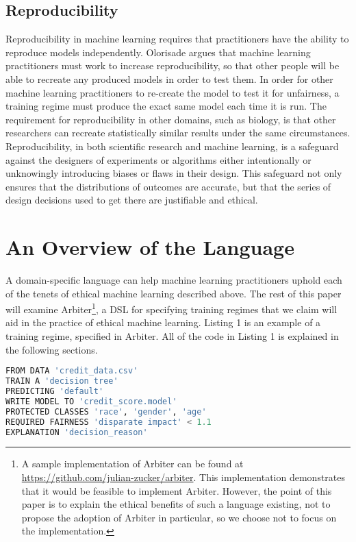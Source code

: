 \documentclass[sigconf]{acmart}
\begin{document}
\subsection{Reproducibility}
Reproducibility in machine learning requires that practitioners have the ability to reproduce models independently. Olorisade  argues that machine learning practitioners must work to increase reproducibility, so that other people will be able to recreate any produced models in order to test them. In order for other machine learning practitioners to re-create the model to test it for unfairness, a training regime must produce the exact same model each time it is run. The requirement for reproducibility in other domains, such as biology, is that other researchers can recreate statistically similar results under the same circumstances. Reproducibility, in both scientific research and machine learning, is a safeguard against the designers of experiments or algorithms either intentionally or unknowingly introducing biases or flaws in their design. This safeguard not only ensures that the distributions of outcomes are accurate, but that the series of design decisions used to get there are justifiable and ethical.

\section{An Overview of the Language}
A domain-specific language can help machine learning practitioners uphold each of the tenets of ethical machine learning described above. The rest of this paper will examine Arbiter\footnote{A sample implementation of Arbiter can be found at \href{https://github.com/julian-zucker/arbiter}{https://github.com/julian-zucker/arbiter}. This implementation demonstrates that it would be feasible to implement Arbiter. However, the point of this paper is to explain the ethical benefits of such a language existing, not to propose the adoption of Arbiter in particular, so we choose not to focus on the implementation.}, a DSL for specifying training regimes that we claim will aid in the practice of ethical machine learning. Listing 1 is an example of a training regime, specified in Arbiter. All of the code in Listing 1 is explained in the following sections.

\begin{lstlisting}[language=Python,caption=Arbiter example.]
FROM DATA 'credit_data.csv'
TRAIN A 'decision tree'
PREDICTING 'default'
WRITE MODEL TO 'credit_score.model'
PROTECTED CLASSES 'race', 'gender', 'age'
REQUIRED FAIRNESS 'disparate impact' < 1.1
EXPLANATION 'decision_reason'
\end{lstlisting}
\end{document}
